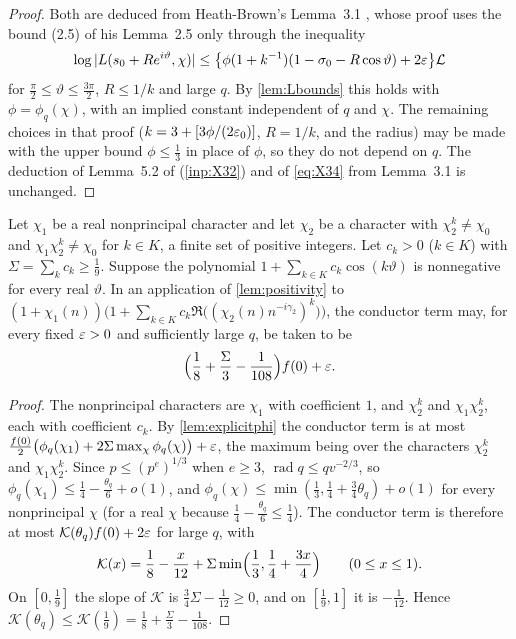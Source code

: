 \begin{proof}
Both are deduced from Heath-Brown's Lemma~3.1 \cite[pp.~12--14, 23--24]{HeathBrown1992zero}
\cite[pp.~19--21]{Xylouris2011nullstellen}, whose proof uses the bound (2.5) of his Lemma~2.5 only through
the inequality
\[
  \log|L(s_0+Re^{i\vartheta},\chi)|\le\bigl\{\phi(1+k^{-1})(1-\sigma_0-R\cos\vartheta)+2\varepsilon\bigr\}\mathcal{L}
\]
for $\frac\pi2\le\vartheta\le\frac{3\pi}2$, $R\le1/k$ and large $q$. By \cref{lem:Lbounds} this holds with
$\phi=\phi_q(\chi)$, with an implied constant independent of $q$ and $\chi$. The remaining choices in
that proof ($k=3+[3\phi/(2\varepsilon_0)]$, $R=1/k$, and the radius) may be made with the upper bound
$\phi\le\frac13$ in place of $\phi$, so they do not depend on $q$. The deduction of Lemma~5.2 of
\cite{HeathBrown1992zero} (\cref{inp:X32}) and of \eqref{eq:X34} from Lemma~3.1 is unchanged.
\end{proof}

\begin{proposition}\label{prop:conductor}
Let $\chi_1$ be a real nonprincipal character and let $\chi_2$ be a character with $\chi_2^k\ne\chi_0$ and $\chi_1\chi_2^k\ne\chi_0$
for $k\in K$, a finite set of positive integers. Let $c_k>0$ ($k\in K$) with $\Sigma=\sum_kc_k\ge\frac19$.
Suppose the polynomial $1+\sum_{k\in K}c_k\cos(k\vartheta)$ is nonnegative for every real
$\vartheta$. In an application of \cref{lem:positivity} to
$(1+\chi_1(n))\bigl(1+\sum_{k\in K}c_k\Re\bigl((\chi_2(n)n^{-i\gamma_2})^k\bigr)\bigr)$,
the conductor term may, for every fixed $\varepsilon>0$ and sufficiently large $q$, be taken to be
\[
  \Bigl(\frac18+\frac\Sigma3-\frac1{108}\Bigr)f(0)+\varepsilon .
\]
\end{proposition}

\begin{proof}
The nonprincipal characters are $\chi_1$ with coefficient $1$, and $\chi_2^k$ and $\chi_1\chi_2^k$, each with
coefficient $c_k$. By \cref{lem:explicitphi} the conductor term is at most
$\frac{f(0)}2\bigl(\phi_q(\chi_1)+2\Sigma\max_\chi\phi_q(\chi)\bigr)+\varepsilon$, the maximum being over the
characters $\chi_2^k$ and $\chi_1\chi_2^k$. Since $p\le(p^e)^{1/3}$ when $e\ge3$,
$\operatorname{rad}q\le qv^{-2/3}$, so $\phi_q(\chi_1)\le\frac14-\frac{\theta_q}6+o(1)$, and
$\phi_q(\chi)\le\min(\frac13,\frac14+\frac34\theta_q)+o(1)$ for every nonprincipal $\chi$ (for a real $\chi$
because $\frac14-\frac{\theta_q}6\le\frac14$).
The conductor term is therefore at most $\mathcal K(\theta_q)f(0)+2\varepsilon$ for large $q$, with
\[
  \mathcal K(x)=\frac18-\frac x{12}+\Sigma\min\Bigl(\frac13,\frac14+\frac{3x}4\Bigr)\qquad(0\le x\le1).
\]
On $[0,\frac19]$ the slope of $\mathcal K$ is $\frac34\Sigma-\frac1{12}\ge0$, and on $[\frac19,1]$ it is
$-\frac1{12}$. Hence $\mathcal K(\theta_q)\le\mathcal K(\frac19)=\frac18+\frac\Sigma3-\frac1{108}$.
\end{proof}

